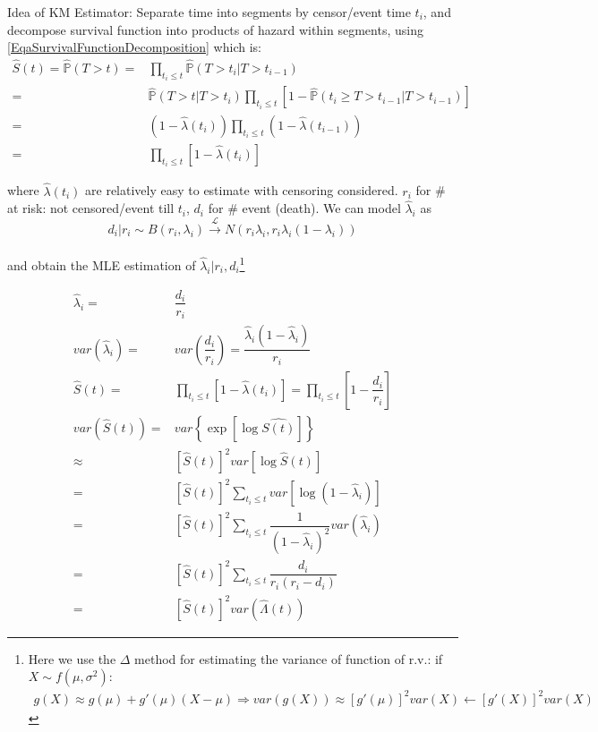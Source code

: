 Idea of KM Estimator: Separate time into segments by censor/event time $ t_i $, and decompose survival function into products of hazard within segments, using \autoref{EqaSurvivalFunctionDecomposition} which is:
\begin{align}
    \hat{S}(t)=\hat{\mathbb{P}}(T>t)=&\prod_{t_i\leq t}\hat{\mathbb{P}}\left( T>t_i |T>t_{i-1}  \right) \\
    =&\hat{\mathbb{P}}\left( T>t|T>t_i \right)  \prod_{t_i\leq t}\left[1- \hat{\mathbb{P}}\left( t_{i}\geq T>t_{i-1} |T>t_{i-1}\right) \right]\\
    =&\left(1-\hat{\lambda }(t_i)\right)\prod_{t_i\leq t}\left(1-\hat{\lambda }(t_{i-1})\right)\\
    =&\prod_{t_i\leq t}\left[1-\hat{\lambda }(t_i)\right]
\end{align}

where $ \hat{\lambda }(t_i) $ are relatively easy to estimate with censoring considered. $ r_i $ for \# at risk: not censored/event till $ t_i $, $ d_i $ for \# event (death). We can model $ \hat{\lambda }_i $ as
\begin{equation}
    d_i\big|r_i \sim B(r_i,\lambda _i)\xrightarrow[]{\mathscr{L}} N(r_i\lambda _i,r_i\lambda _i(1-\lambda _i))
\end{equation}

and obtain the MLE estimation of $ \hat{\lambda }_i|r_i,d_i $\footnote{Here we use the $ \Delta  $ method for estimating the variance of function of r.v.: if $ X\sim f(\mu ,\sigma ^2) $:
\begin{align}
    g(X)\approx g(\mu )+g'(\mu )(X-\mu )\Rightarrow var(g(X))\approx [g'(\mu )]^2var(X)\leftarrow [g'(X)]^2var(X)
\end{align}}

\begin{align}
    \hat{\lambda }_i=&\dfrac{d_i}{r_i}\\
    var(\hat{\lambda }_i)=&var(\dfrac{d_i}{r_i})=\dfrac{\hat{\lambda }_i(1-\hat{\lambda }_i)}{r_i}\\
    \hat{S}(t)=&\prod_{t_i\leq t}\left[1-\hat{\lambda }(t_i)\right]=\prod_{t_i\leq t}\left[1-\dfrac{d_i}{r_i}\right]\tag{KM Estimator}\\
    var(\hat{S}(t))=&var\left\{ \exp\left[ \log\hat{S(t)} \right] \right\}\\
    \approx&[\hat{S}(t)]^2var\left[\log \hat{S}(t)\right]\\
    =&[\hat{S}(t)]^2\sum_{t_i\leq t}var\left[\log (1-\hat{\lambda }_i) \right]\\
    =&[\hat{S}(t)]^2\sum_{t_i\leq t}\dfrac{1}{(1-\hat{\lambda }_i)^2}var(\hat{\lambda }_i)\\
    =&[\hat{S}(t)]^2\sum_{t_i\leq t}\dfrac{d_i}{r_i(r_i-d_i)}\tag{Greenwood' Formula}\\
    =&[\hat{S}(t)]^2var(\hat{\Lambda }(t))
\end{align}

